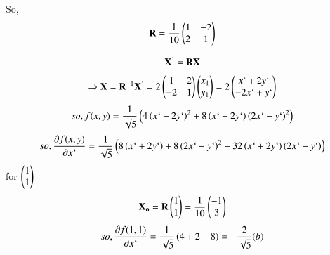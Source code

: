 \documentclass[journal,12pt,onecolumn]{IEEEtran}
\begin{document}
So, 
\begin{align}
		\vec{R}=\frac{1}{10}\myvec{1&-2\\2&1}
\end{align}

\begin{align}
\vec{X}^` = \vec{R}\vec{X}
\end{align}
\begin{align}
	\Rightarrow	\vec{X} = \vec{R}^{-1}\vec{X}^` = 2\myvec{1&2\\-2&1}\myvec{x_1\\y_1} = 2\myvec{x`+2y`\\-2x`+y`}
\end{align}
\begin{align}
		so, f(x,y) = \frac{1}{\sqrt{5}}\brak{4\brak{x`+2y`}^2 + 8\brak{x`+2y`}\brak{2x`-y`}^2}
\end{align}
\begin{align}
		so, \frac{\partial f(x,y)}{\partial x`} = \frac{1}{\sqrt{5}}\brak{8\brak{x`+2y`} +8\brak{2x`-y`}^2+32\brak{x`+2y`}\brak{2x`-y`}}
\end{align}
for $\myvec{1\\1}$
\begin{align}
		\vec{X_o} = \vec{R}\myvec{1\\1} = \frac{1}{10}\myvec{-1\\3}
\end{align}
\begin{align}
		so, \frac{\partial f(1,1)}{\partial x`} = \frac{1}{\sqrt{5}}\brak{4+2-8} = -\frac{2}{\sqrt{5}} (b)
\end{align}
\end{document}

